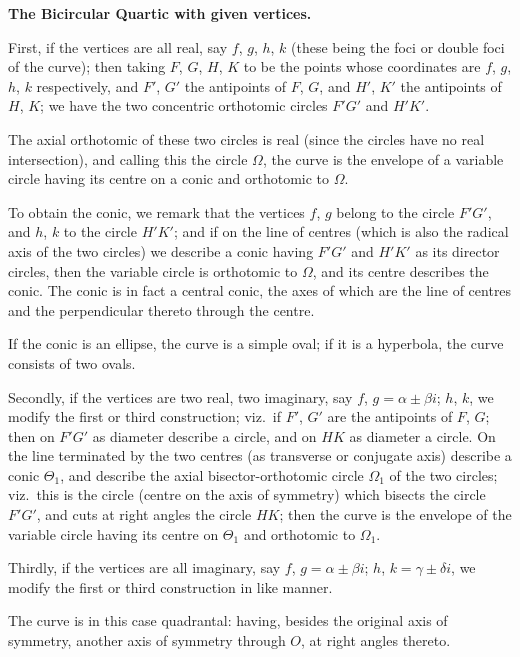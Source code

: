 \documentclass[12pt,a4paper]{article}
\theoremstyle{plain}
\theoremstyle{definition}
\begin{document}
\newpage
\setcounter{page}{14}

\textbf{The Bicircular Quartic with given vertices.}

First, if the vertices are all real, say $f$, $g$, $h$, $k$ (these being the foci or double foci of the curve); then taking $F$, $G$, $H$, $K$ to be the points whose coordinates are $f$, $g$, $h$, $k$ respectively, and $F'$, $G'$ the antipoints of $F$, $G$, and $H'$, $K'$ the antipoints of $H$, $K$; we have the two concentric orthotomic circles $F'G'$ and $H'K'$.

The axial orthotomic of these two circles is real (since the circles have no real intersection), and calling this the circle $\Omega$, the curve is the envelope of a variable circle having its centre on a conic and orthotomic to $\Omega$.

To obtain the conic, we remark that the vertices $f$, $g$ belong to the circle $F'G'$, and $h$, $k$ to the circle $H'K'$; and if on the line of centres (which is also the radical axis of the two circles) we describe a conic having $F'G'$ and $H'K'$ as its director circles, then the variable circle is orthotomic to $\Omega$, and its centre describes the conic. The conic is in fact a central conic, the axes of which are the line of centres and the perpendicular thereto through the centre.

If the conic is an ellipse, the curve is a simple oval; if it is a hyperbola, the curve consists of two ovals.

\newpage
\setcounter{page}{15}

Secondly, if the vertices are two real, two imaginary, say $f$, $g = \alpha \pm \beta i$; $h$, $k$, we modify the first or third construction; viz.\ if $F'$, $G'$ are the antipoints of $F$, $G$; then on $F'G'$ as diameter describe a circle, and on $HK$ as diameter a circle. On the line terminated by the two centres (as transverse or conjugate axis) describe a conic $\Theta_1$, and describe the axial bisector-orthotomic circle $\Omega_1$ of the two circles; viz.\ this is the circle (centre on the axis of symmetry) which bisects the circle $F'G'$, and cuts at right angles the circle $HK$; then the curve is the envelope of the variable circle having its centre on $\Theta_1$ and orthotomic to $\Omega_1$.

Thirdly, if the vertices are all imaginary, say $f$, $g = \alpha \pm \beta i$; $h$, $k = \gamma \pm \delta i$, we modify the first or third construction in like manner.

The curve is in this case quadrantal: having, besides the original axis of symmetry, another axis of symmetry through $O$, at right angles thereto.
\end{document}
